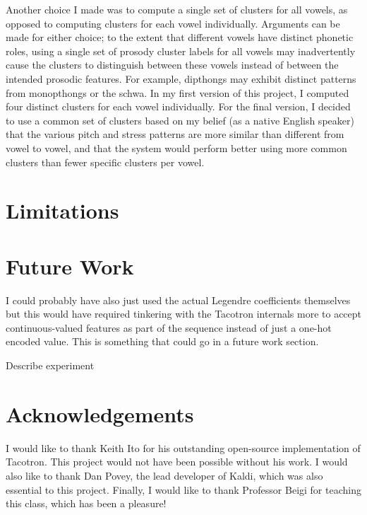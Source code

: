 \documentclass{article}
\begin{document}
Another choice I made was to compute a single set of clusters for all vowels, as opposed to computing clusters for each vowel individually.
Arguments can be made for either choice; to the extent that different vowels have distinct phonetic roles, using a single set of prosody cluster labels for all vowels may inadvertently cause the clusters to distinguish between these vowels instead of between the intended prosodic features. For example, dipthongs may exhibit distinct patterns from monopthongs or the schwa.
In my first version of this project, I computed four distinct clusters for each vowel individually. For the final version, I decided to use a common set of clusters based on my belief (as a native English speaker) that the various pitch and stress patterns are more similar than different from vowel to vowel, and that the system would perform better using more common clusters than fewer specific clusters per vowel.

\section{Limitations}

\section{Future Work}
\label{sec:futurework}

I could probably have also just used the actual Legendre coefficients themselves but this would have required tinkering with the Tacotron internals more to accept continuous-valued features as part of the sequence instead of just a one-hot encoded value. This is something that could go in a future work section.

Describe experiment

\section{Acknowledgements}
\label{sec:acknowledgements}
I would like to thank Keith Ito for his outstanding open-source implementation of Tacotron. This project would not have been possible without his work. I would also like to thank Dan Povey, the lead developer of Kaldi, which was also essential to this project. Finally, I would like to thank Professor Beigi for teaching this class, which has been a pleasure!

\vfill\pagebreak



\end{document}
